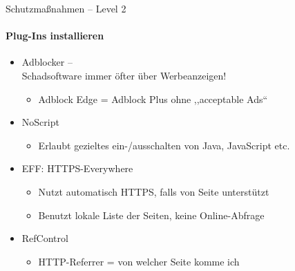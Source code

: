   \begin{frame}{Schutzmaßnahmen -- Level 2}
  \framesubtitle{Plug-Ins installieren}
    \begin{itemize}
      \item Adblocker --\\ Schadsoftware immer öfter über Werbeanzeigen!
      \begin{itemize}
        \item Adblock Edge = Adblock Plus ohne ,,acceptable Ads``
      \end{itemize}
      \item NoScript
      \begin{itemize}
        \item Erlaubt gezieltes ein-/ausschalten von Java, JavaScript etc.
      \end{itemize}
      \item EFF: HTTPS-Everywhere
      \begin{itemize}
        \item Nutzt automatisch HTTPS, falls von Seite unterstützt
        \item Benutzt lokale Liste der Seiten, keine Online-Abfrage
      \end{itemize}
      \item RefControl
      \begin{itemize}
        \item HTTP-Referrer = von welcher Seite komme ich
      \end{itemize}
    \end{itemize}
  \end{frame}

